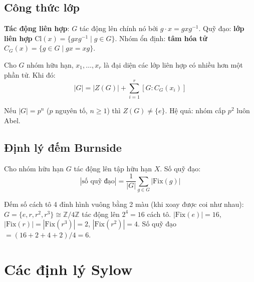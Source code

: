 \documentclass[12pt,a4paper]{article}
\begin{document}
\subsection{Công thức lớp}

\begin{dinhnghia}
  \textbf{Tác động liên hợp}: $G$ tác động lên chính nó bởi $g \cdot x = gxg^{-1}$. Quỹ đạo: \textbf{lớp liên hợp} $\mathrm{Cl}(x) = \{gxg^{-1} \mid g \in G\}$. Nhóm ổn định: \textbf{tâm hóa tử} $C_G(x) = \{g \in G \mid gx = xg\}$.
\end{dinhnghia}

\begin{dinhly}[title={Công thức lớp}]
  Cho $G$ nhóm hữu hạn, $x_1, \ldots, x_r$ là đại diện các lớp liên hợp có nhiều hơn một phần tử. Khi đó:
  \[
    |G| = |Z(G)| + \sum_{i=1}^{r} [G : C_G(x_i)]
  \]
\end{dinhly}

\begin{dinhly}
  Nếu $|G| = p^n$ ($p$ nguyên tố, $n \ge 1$) thì $Z(G) \ne \{e\}$. Hệ quả: nhóm cấp $p^2$ luôn Abel.
\end{dinhly}

\subsection{Định lý đếm Burnside}

\begin{dinhly}[title={Bổ đề Burnside (Cauchy--Frobenius)}]
  Cho nhóm hữu hạn $G$ tác động lên tập hữu hạn $X$. Số quỹ đạo:
  \[
    |\text{số quỹ đạo}| = \frac{1}{|G|} \sum_{g \in G} |\mathrm{Fix}(g)|
  \]
\end{dinhly}

\begin{vidu}
  Đếm số cách tô 4 đỉnh hình vuông bằng 2 màu (khi xoay được coi như nhau): $G = \{e, r, r^2, r^3\} \cong \mathbb{Z}/4\mathbb{Z}$ tác động lên $2^4 = 16$ cách tô. $|\mathrm{Fix}(e)| = 16$, $|\mathrm{Fix}(r)| = |\mathrm{Fix}(r^3)| = 2$, $|\mathrm{Fix}(r^2)| = 4$. Số quỹ đạo $= (16 + 2 + 4 + 2)/4 = 6$.
\end{vidu}

\section{Các định lý Sylow}
\end{document}
